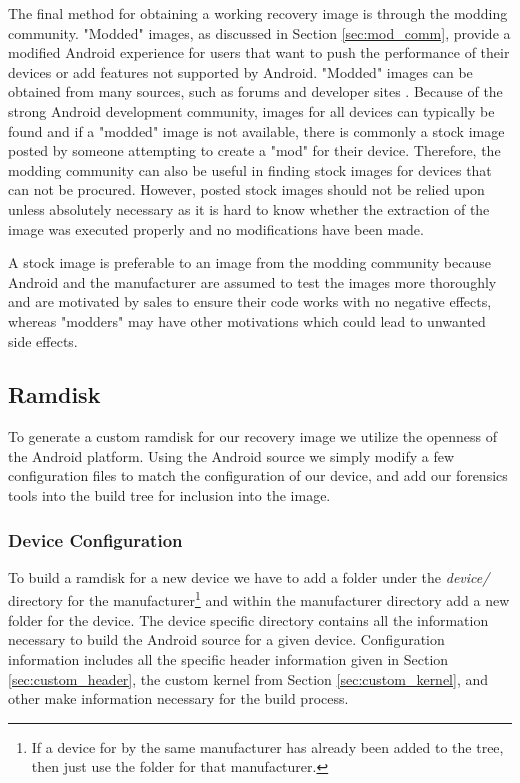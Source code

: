 The final method for obtaining a working recovery image is through the modding community.  "Modded" images, as discussed in Section \ref{sec:mod_comm}, provide a modified Android experience for users that want to push the performance of their devices or add features not supported by Android.  "Modded" images can be obtained from many sources, such as forums \cite{droid_mod_forum, xda_developer_mod_forum, android_modz} and developer sites \cite{cyanogen_wiki, amon_ra_wiki}.  Because of the strong Android development community, images for all devices can typically be found and if a "modded" image is not available, there is commonly a stock image posted by someone attempting to create a "mod" for their device.  Therefore, the modding community can also be useful in finding stock images for devices that can not be procured.  However, posted stock images should not be relied upon unless absolutely necessary as it is hard to know whether the extraction of the image was executed properly and no modifications have been made.

A stock image is preferable to an image from the modding community because Android and the manufacturer are assumed to test the images more thoroughly and are motivated by sales to ensure their code works with no negative effects, whereas "modders" may have other motivations which could lead to unwanted side effects.

\subsection{Ramdisk}
\label{sec:custom_ramdisk}

To generate a custom ramdisk for our recovery image we utilize the openness of the Android platform.  Using the Android source \cite{_welcome_????} we simply modify a few configuration files to match the configuration of our device, and add our forensics tools into the build tree for inclusion into the image.

\subsubsection{Device Configuration}
\label{sec:device_config}

To build a ramdisk for a new device we have to add a folder under the \emph{device/} directory for the manufacturer\footnote{If a device for by the same manufacturer has already been added to the tree, then just use the folder for that manufacturer.} and within the manufacturer directory add a new folder for the device.  The device specific directory contains all the information necessary to build the Android source for a given device.  Configuration information includes all the specific header information given in Section \ref{sec:custom_header}, the custom kernel from Section \ref{sec:custom_kernel}, and other make information necessary for the build process.

